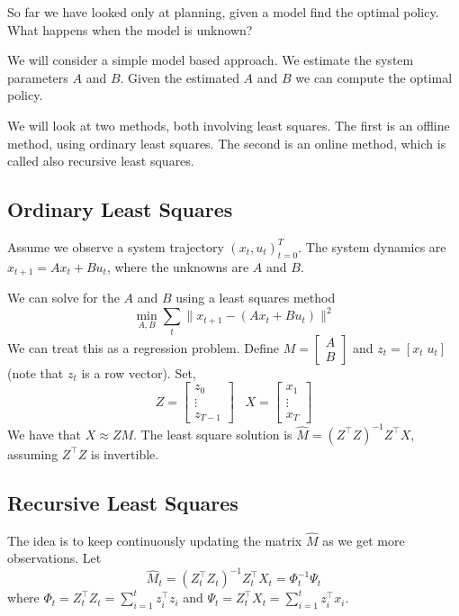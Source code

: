 So far we have looked only at planning, given a model find the
optimal policy. What happens when the model is unknown?

We will consider a simple  model based approach. We estimate the
system parameters $A$ and $B$. Given the estimated $A$ and $B$ we
can compute the optimal policy.

We will look at two methods, both involving least squares. The first
is an offline method, using ordinary least squares. The second is an
online method, which is called also recursive least squares.



\subsection{Ordinary Least Squares}

Assume we observe a system trajectory $(x_t,u_t)_{t=0}^T$. The
system dynamics are $x_{t+1}=Ax_t+B u_t$, where the unknowns are $A$
and $B$.

We can solve for the $A$ and $B$ using a least squares method
\[
\min_{A,B} \sum_t \| x_{t+1}-(Ax_t+Bu_t)  \|^2
\]
We can treat this as a regression problem. Define
$M=\begin{bmatrix}A\\ B\end{bmatrix}$ and $z_t =[x_t\; u_t]$ (note
that $z_t$ is a row vector). Set,
\[
Z=\begin{bmatrix}z_0\\ \vdots\\z_{T-1}\end{bmatrix}\;\;\; X=
\begin{bmatrix}x_1\\ \vdots\\x_{T}\end{bmatrix}
\]
We have that $X\approx Z M$. The least square solution is
$\hat{M}=(Z^\top Z)^{-1}Z^\top X$, assuming $Z^\top Z$ is
invertible.

\subsection{Recursive Least Squares}

The idea is to keep continuously updating the matrix $\hat{M}$ as we
get more observations. Let
\[
\hat{M}_t = (Z_t^\top Z_t)^{-1}Z_t^\top X_t=\Phi_t^{-1}\Psi_t
\]
where $\Phi_t=Z_t^\top Z_t=\sum_{i=1}^t z_i^\top z_i$ and
$\Psi_t=Z_t^\top X_t=\sum_{i=1}^t z_i^\top x_i$.

